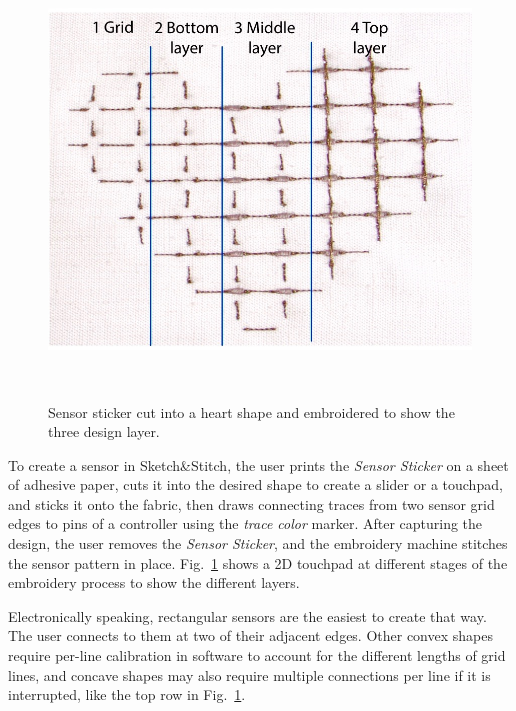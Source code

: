 \documentclass[header.tex]{subfiles}
\begin{document}
\begin{figure}
\centering
  \includegraphics[width=0.7\columnwidth]{figures/heart}
  \caption{Sensor sticker cut into a heart shape and embroidered to show the three design layer.}~\label{fig:Sensor}
  \vspace{-2.5em}
  \end{figure}
  
To create a sensor in Sketch\&Stitch, the user prints the \textit{Sensor Sticker} on a sheet of adhesive paper, cuts it into the desired shape to create a slider or a touchpad, and sticks it onto the fabric, then draws connecting traces from two sensor grid edges to pins of a controller using the \textit{trace color} marker. After capturing the design, the user removes the \textit{Sensor Sticker}, and the embroidery machine stitches the sensor pattern in place. Fig.\ \ref{fig:Sensor} shows a 2D touchpad at different stages of the embroidery process to show the different layers.

Electronically speaking, rectangular sensors are the easiest to create that way. The user connects to them at two of their adjacent edges. Other convex shapes require per-line calibration in software to account for the different lengths of grid lines, and concave shapes may also require multiple connections per line if it is interrupted, like the top row in Fig.\ \ref{fig:Sensor}.
\end{document}
